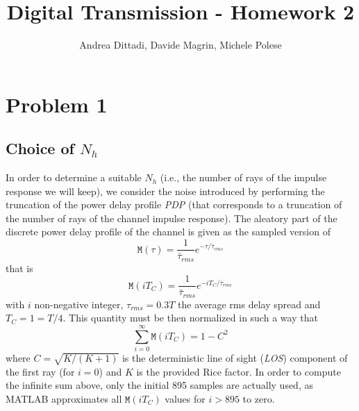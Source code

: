 \documentclass[10pt]{article}
\newcommand{\M} {\mathtt{M}}
\begin{document}
\title{Digital Transmission - Homework 2}
\author{Andrea Dittadi, Davide Magrin, Michele Polese}

\maketitle

\section*{Problem 1}

\subsection*{Choice of $N_h$}

In order to determine a suitable $N_h$ (i.e., the number of rays of the impulse response we will keep), we consider the noise introduced by performing the truncation of the power delay profile \textit{PDP} (that corresponds to a truncation of the number of rays of the channel impulse response). The aleatory part of the discrete power delay profile of the channel is given as the sampled version of
\begin{equation}
\M(\tau) = \frac{1}{\bar{\tau}_{rms}} e^{-\tau / \bar{\tau}_{rms}}
\end{equation}
that is
\begin{equation}
\M(iT_C) = \frac{1}{\bar{\tau}_{rms}} e^{-iT_C / \bar{\tau}_{rms}}
\end{equation}
with $i$ non-negative integer, $\tau_{rms} = 0.3T$ the average rms delay spread and $T_C = 1 = T/4$. This quantity must be then normalized in such a way that
\begin{equation}
\sum_{i=0}^{\infty} \M(iT_C) = 1 - C^2
\end{equation}
where $C = \sqrt{K / (K+1)}$ is the deterministic line of sight (\textit{LOS}) component of the first ray (for $i=0$) and $K$ is the provided Rice factor. In order to compute the infinite sum above, only the initial 895 samples are actually used, as MATLAB approximates all $\M(iT_C)$ values for $i > 895$ to zero.
\end{document}
